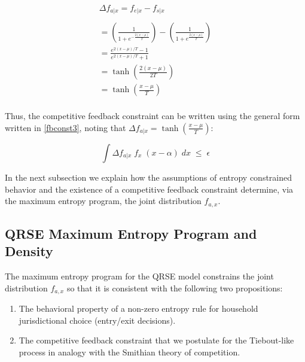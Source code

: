 \begin{equation} \label{tanhd}
\begin{aligned}
& \Delta f_{a|x} = f_{e|x} - f_{s|x} \\
&\\
&=\left(\frac{1}{1+e^{-\frac{2(x-\mu)}{T}}}\right) - \left(\frac{1}{1+e^{\frac{2(x-\mu)}{T}}}\right)
&\\
&= \frac{e^{2(x-\mu)/T}-1}{e^{2(x-\mu)/T}+1}
&\\
&=\operatorname{tanh}\left( \frac{2(x-\mu)}{2T}\right)
&\\
&=\operatorname{tanh}\left( \frac{x-\mu}{T}\right)
&\\
\end{aligned}
\end{equation}

\medskip 

Thus, the competitive feedback constraint can be written using the general form written in
\ref{fbconst3}, noting that $\Delta f_{a|x} = \operatorname{tanh}\left(
\frac{x-\mu}{T}\right)$: 

\begin{equation} \label{fbconst3}
\int \Delta f_{a|x} \; f_{x} \; (x-\alpha) \; dx \; \leq \; \epsilon
\end{equation}

\medskip 

In the next subsection we explain how the assumptions of entropy constrained behavior and the
existence of a competitive feedback constraint determine, via the maximum
entropy program, the joint distribution $f_{a,x}$.


\subsection{QRSE Maximum Entropy Program and Density}
\label{sec-4-4}

The maximum entropy program for the QRSE model constrains the joint
distribution $f_{a,x}$ so that it is consistent with the following two
propositions:

\medskip

\begin{enumerate}
\item The behavioral property of a non-zero entropy rule for household
jurisdictional choice (entry/exit decisions).  \item The competitive
feedback constraint that we postulate for the Tiebout-like process in
analogy with the Smithian theory of competition.  \end{enumerate}

